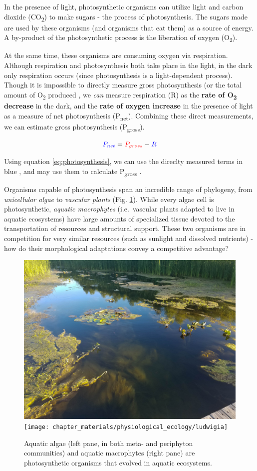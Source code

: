 \documentclass[]{krantz}
\theoremstyle{definition}
\theoremstyle{definition}
\theoremstyle{definition}
\theoremstyle{remark}
\begin{document}
\newcommand{\textunderscript}[1]{$_{\text{#1}}$}

In the presence of light, photosynthetic organisms can utilize light and
carbon dioxide (CO\textsubscript{2}) to make sugars - the process of
photosynthesis. The sugars made are used by these organisms (and
organisms that eat them) as a source of energy. A by-product of the
photosynthetic process is the liberation of oxygen (O\textsubscript{2}).

At the same time, these organisms are consuming oxygen via respiration.
Although respiration and photosynthesis both take place in the light, in
the dark only respiration occurs (since photosynthesis is a
light-dependent process). Though it is impossible to directly measure
gross photosynthesis (or the total amount of O\textsubscript{2} produced
\citep{wohlfahrt_many_2015}, we \emph{can} measure respiration (R) as
the \textbf{rate of O\textsubscript{2} decrease} in the dark, and the
\textbf{rate of oxygen increase} in the presence of light as a measure
of net photosynthesis (P\textsubscript{net}). Combining these direct
measurements, we can estimate gross photosynthesis
(P\textsubscript{gross}).

\begin{equation}
\color{blue} P_{net} \color{black}= \color{red}P_{gross} \color{black}- \color{blue}R
\label{eq:photosynthesis}
\end{equation}

Using equation \eqref{eq:photosynthesis}, we can use the direclty measured
terms in \color{blue} blue \color{black}, and may use them to calculate
\color{red} P\textsubscript{gross} \color{black}.

Organisms capable of photosynthesis span an incredible range of
phylogeny, from \emph{unicellular algae} to \emph{vascular plants} (Fig.
\ref{fig:organisms}). While every algae cell is photosynthetic,
\emph{aquatic macrophytes} (i.e.~vascular plants adapted to live in
aquatic ecosystems) have large amounts of specialized tissue devoted to
the transportation of resources and structural support. These two
organisms are in competition for very similar resources (such as
sunlight and dissolved nutrients) - how do their morphological
adaptations convey a competitive advantage?

\begin{figure}
\includegraphics[width=0.5\linewidth]{chapter_materials/physiological_ecology/aquatic_photosynthesis} \texttt{[image: chapter\_materials/physiological\_ecology/ludwigia]} \caption{Aquatic algae (left pane, in both meta- and periphyton communities) and aquatic macrophytes (right pane) are photosynthetic organisms that evolved in aquatic ecosystems.}\label{fig:organisms}
\end{figure}
\end{document}

